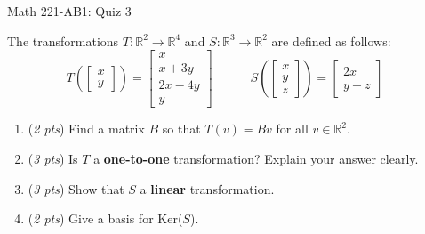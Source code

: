 \documentclass[11pt]{article}
\begin{document}
\begin{center}
\Large
\rm{Math 221-AB1:  Quiz 3}
\\
\end{center}
\vspace{0.1in}

The transformations $T:\mathbb{R}^2\to\mathbb{R}^4$ and $S:\mathbb{R}^3\to\mathbb{R}^2$ 
are defined as follows:
\begin{displaymath}
T\left(\left[ \begin{array}{r} x \\ y \end{array} \right] \right) =  \left[ \begin{array}{c} x \\ x+3y \\ 2x-4y \\ y \end{array} \right] \quad \quad \quad 
S\left(\left[ \begin{array}{r} x \\ y \\ z  \end{array} \right] \right) =  \left[ \begin{array}{c} 2x \\ y+z \end{array} \right] \quad
\end{displaymath}
\begin{enumerate}
\item{(\emph{2 pts}) Find a matrix $B$ so that $T(v)=Bv$ for all $v\in\mathbb{R}^2$.}
\item{(\emph{3 pts}) Is $T$ a \textbf{one-to-one} transformation?  Explain your answer clearly.}
\item{(\emph{3 pts}) Show that $S$ a \textbf{linear} transformation.}
\item{(\emph{2 pts}) Give a basis for Ker($S$).}
\end{enumerate}


\vspace{4.5in}



\vspace{0.1in}
\end{document}
